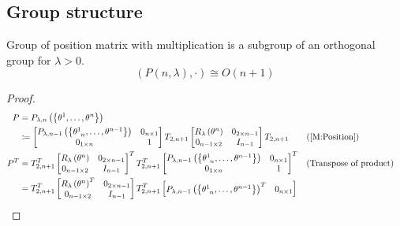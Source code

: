 \documentclass[../main.tex]{subfiles}
\begin{document}
\subsection{Group structure}
\begin{proposition}
Group of position matrix with multiplication is a subgroup of an orthogonal group for \(\lambda>0\).
\[
\left(P\left(n,\lambda\right),\cdot\right)\cong O\left(n+1\right)
\]
\end{proposition}
\begin{proof}
\begin{align*}
P&=P_{\lambda,n}\left(\left\{\tensor{\theta}{^1},\dots,\tensor{\theta}{^n}\right\}\right)\\
&\coloneqq
\begin{bmatrix}
P_{\lambda,n-1}\left(\left\{\tensor{\theta}{^1_{n}},\dots,\tensor{\theta}{^{n-1}}\right\}\right)&0_{n\times 1}\\
0_{1\times n}&1\\
\end{bmatrix}
T_{2,n+1}
\begin{bmatrix}
R_\lambda\left(\tensor{\theta}{^n}\right)&0_{{2}\times{n-1}}\\
0_{{n-1}\times{2}}&{I}_{n-1}\\
\end{bmatrix}
T_{2,n+1}
&&\text{(\cref{M:Position})}\\
P^T
&=
T_{2,n+1}^T
\begin{bmatrix}
R_\lambda\left(\tensor{\theta}{^n}\right)&0_{{2}\times{n-1}}\\
0_{{n-1}\times{2}}&{I}_{n-1}\\
\end{bmatrix}^T
T_{2,n+1}^T
\begin{bmatrix}
P_{\lambda,n-1}\left(\left\{\tensor{\theta}{^1_{n}},\dots,\tensor{\theta}{^{n-1}}\right\}\right)&0_{n\times 1}\\
0_{1\times n}&1\\
\end{bmatrix}^T
&&\text{(Transpose of product)}\\
&=
T_{2,n+1}^T
\begin{bmatrix}
R_\lambda\left(\tensor{\theta}{^n}\right)^T&0_{{2}\times{n-1}}\\
0_{{n-1}\times{2}}&{I}_{n-1}\\
\end{bmatrix}
T_{2,n+1}^T
\begin{bmatrix}
P_{\lambda,n-1}\left(\left\{\tensor{\theta}{^1_{n}},\dots,\tensor{\theta}{^{n-1}}\right\}\right)^T&0_{n\times 1}\\

\end{bmatrix}
\end{align*}
\end{proof}
\end{document}

